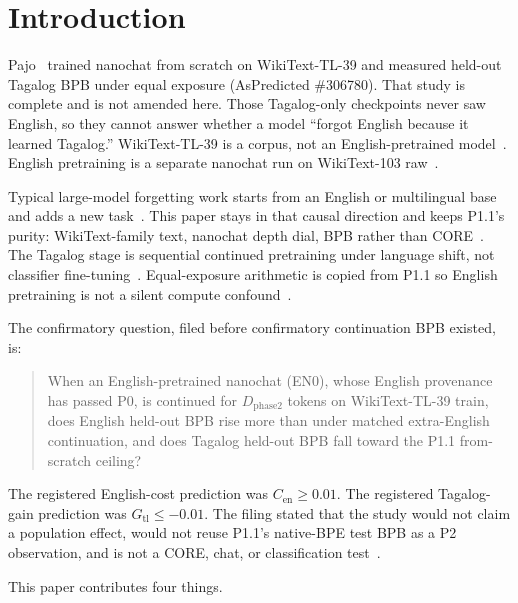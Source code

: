 \documentclass[11pt,a4paper]{article}
\begin{document}
\section{Introduction}
\label{sec:intro}

Pajo~\cite{pajo2026p11} trained nanochat from scratch on WikiText-TL-39 and measured held-out Tagalog BPB under equal exposure (AsPredicted \#306780). That study is complete and is not amended here. Those Tagalog-only checkpoints never saw English, so they cannot answer whether a model ``forgot English because it learned Tagalog.'' WikiText-TL-39 is a corpus, not an English-pretrained model~\cite{cruz2019eval}. English pretraining is a separate nanochat run on WikiText-103 raw~\cite{merity2017pointer}.

Typical large-model forgetting work starts from an English or multilingual base and adds a new task~\cite{luo2023forgetting,ramasesh2021forgetscale,mccloskey1989catastrophic}. This paper stays in that causal direction and keeps P1.1's purity: WikiText-family text, nanochat depth dial, BPB rather than CORE~\cite{karpathy2026nanochat,pajo2026p11}. The Tagalog stage is sequential continued pretraining under language shift, not classifier fine-tuning~\cite{shi2024continual,cruz2019eval}. Equal-exposure arithmetic is copied from P1.1 so English pretraining is not a silent compute confound~\cite{kaplan2020scaling,hoffmann2022chinchilla,muennighoff2023dataconstrained}.

The confirmatory question, filed before confirmatory continuation BPB existed, is:

\begin{quote}
When an English-pretrained nanochat (EN0), whose English provenance has passed P0, is continued for $D_{\mathrm{phase2}}$ tokens on WikiText-TL-39 train, does English held-out BPB rise more than under matched extra-English continuation, and does Tagalog held-out BPB fall toward the P1.1 from-scratch ceiling?
\end{quote}

The registered English-cost prediction was $C_{\mathrm{en}}\ge 0.01$. The registered Tagalog-gain prediction was $G_{\mathrm{tl}}\le -0.01$. The filing stated that the study would not claim a population effect, would not reuse P1.1's native-BPE test BPB as a P2 observation, and is not a CORE, chat, or classification test~\cite{aspredicted306935}.

This paper contributes four things.
\end{document}

